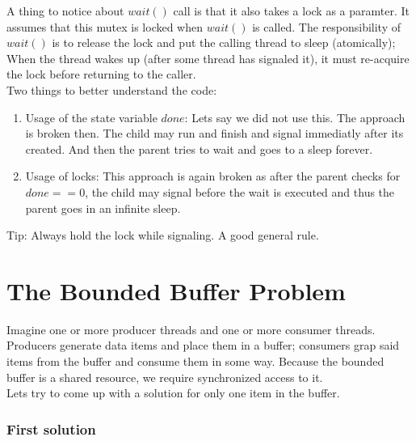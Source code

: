 A thing to notice about $wait()$ call is that it also takes a lock as a paramter.
It assumes that this mutex is locked when $wait()$ is called. The responsibility
of $wait()$ is to release the lock and put the calling thread to sleep (atomically);
When the thread wakes up (after some thread has signaled it), it must re-acquire
the lock before returning to the caller.\\

Two things to better understand the code:

\begin{enumerate}
    \item Usage of the state variable $done$: Lets say we did not use this. The
        approach is broken then. The child may run and finish and signal immediatly
        after its created. And then the parent tries to wait and goes to a
        sleep forever.
    \item Usage of locks: This approach is again broken as after the parent 
        checks for $done == 0$, the child may signal before the wait is executed
        and thus the parent goes in an infinite sleep.
\end{enumerate}

Tip: Always hold the lock while signaling. A good general rule.\\

\section{The Bounded Buffer Problem}

Imagine one or more producer threads and one or more consumer threads. Producers 
generate data items and place them in a buffer; consumers grap said items from
the buffer and consume them in some way. Because the bounded buffer is a shared
resource, we require synchronized access to it.\\

Lets try to come up with a solution for only one item in the buffer.

\subsubsection{First solution}

